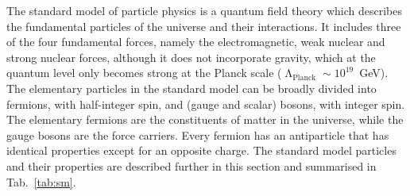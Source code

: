The standard model of particle physics is a quantum field theory which 
describes the fundamental particles of the universe and their interactions. It 
includes three of the four fundamental forces, namely the electromagnetic, weak 
nuclear and strong nuclear forces, although it does not incorporate gravity, 
which at the quantum level only becomes strong at the Planck scale 
($\upLambda_{\mathrm{Planck}} \sim 10^{19}$~GeV). 
The elementary particles in the standard model can be broadly divided into 
fermions, with half-integer spin, and (gauge and scalar) bosons, with integer 
spin. The elementary fermions are the constituents of matter in the universe, 
while the gauge bosons are the force carriers. 
Every fermion has an antiparticle that has identical properties except for 
an opposite charge.
The standard model particles and their properties are described further in this 
section and summarised in Tab.~\ref{tab:sm}.


